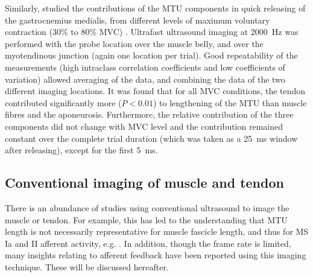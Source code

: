Similarly, \citeauthor{farcy_interaction_2014} studied the contributions of the MTU components in quick releasing of the gastrocnemius medialis, from different levels of maximum voluntary contraction (30\% to 80\% MVC) \cite{farcy_interaction_2014}. Ultrafast ultrasound imaging at \SI{2000}{\hertz} was performed with the probe location over the muscle belly, and over the myotendinous junction (again one location per trial). Good repeatability of the measurements (high intraclass correlation coefficients and low coefficients of variation) allowed averaging of the data, and combining the data of the two different imaging locations. It was found that for all MVC conditions, the tendon contributed significantly more ($P<0.01$) to lengthening of the MTU than muscle fibres and the aponeurosis. 
Furthermore, the relative contribution of the three components did not change with MVC level and the contribution remained constant over the complete trial duration (which was taken as a \SI{25}{\milli\second} window after releasing), except for the first \SI{5}{\milli\second}. 






\subsection{Conventional imaging of muscle and tendon}
There is an abundance of studies using conventional ultrasound to image the muscle or tendon. For example, this has led to the understanding that MTU length is not necessarily representative for muscle fascicle length, and thus for MS Ia and II afferent activity, e.g. \cite{maas_is_2009, cronin_automatic_2011}. In addition, though the frame rate is limited, many insights relating to afferent feedback have been reported using this imaging technique. These will be discussed hereafter. 




